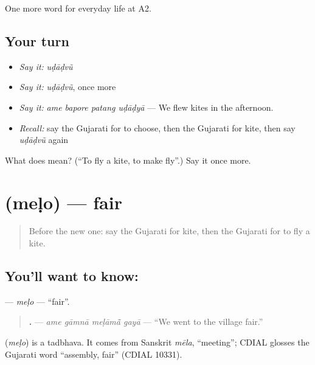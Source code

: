 \begin{grammarlens}[title={What you've built}]
One more word for everyday life at A2.
\end{grammarlens}

\subsection*{Your turn}
\begin{itemize}
\raggedright
  \item \emph{Say it:} \emph{uḍāḍvũ}
  \item \emph{Say it:} \emph{uḍāḍvũ}, once more
  \item \emph{Say it:} \emph{ame bapore patang uḍāḍyā} — We flew kites in the afternoon.
  \item \emph{Recall:} say the Gujarati for to choose, then the Gujarati for kite, then say \emph{uḍāḍvũ} again
\end{itemize}

\begin{tcolorbox}[breakable,colback=teal!4,colframe=teal!35!black,title={Before you move on}]
What does  mean? (\textquotedblleft{}To fly a kite, to make fly\textquotedblright{}.) Say it once more.
\end{tcolorbox}
\section[\texorpdfstring{\gu{મેળો} (meḷo)}{મેળો (meḷo)}]{ (meḷo) — fair}

\label{lesson:GU-C261-melo}



\begin{quote}
Before the new one: say the Gujarati for kite, then the Gujarati for to fly a kite.
\end{quote}

\subsection*{You'll want to know: }
\textbf{} — \emph{meḷo} — \textquotedblleft{}fair\textquotedblright{}.

\begin{quote}
\textbf{   .} — \emph{ame gāmnā meḷāmā̃ gayā} — \textquotedblleft{}We went to the village fair.\textquotedblright{}
\end{quote}

\begin{cousinweb}
\textbf{} (\emph{meḷo}) is a tadbhava. It comes from Sanskrit \emph{mēla}, \textquotedblleft{}meeting\textquotedblright{}; CDIAL glosses the Gujarati word \textquotedblleft{}assembly, fair\textquotedblright{} (CDIAL 10331).
\end{cousinweb}

